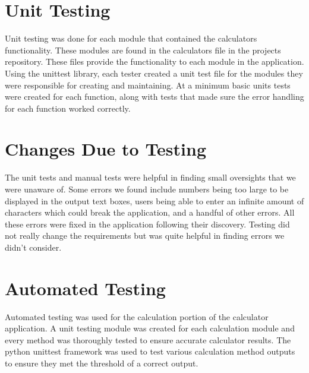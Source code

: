 \documentclass[12pt, titlepage]{article}
\begin{document}
\section{Unit Testing}
Unit testing was done for each module that contained the calculators functionality. These modules are found in the calculators file in the projects repository. These files provide the functionality to each module in the application. Using the unittest library, each tester created a unit test file for the modules they were responsible for creating and maintaining. At a minimum basic units tests were created for each function, along with tests that made sure the error handling for each function worked correctly.

\section{Changes Due to Testing}

The unit tests and manual tests were helpful in finding small oversights that we were unaware of. Some errors we found include numbers being too large to be displayed in the output text boxes, users being able to enter an infinite amount of characters which could break the application, and a handful of other errors. All these errors were fixed in the application following their discovery. Testing did not really change the requirements but was quite helpful in finding errors we didn't consider.

\section{Automated Testing}
Automated testing was used for the calculation portion of the calculator application. A unit testing module was created for each calculation module and every method was thoroughly tested to ensure accurate calculator results. The python unittest framework was used to test various calculation method outputs to ensure they met the threshold of a correct output.
\end{document}
